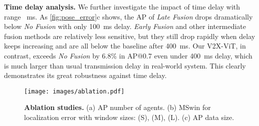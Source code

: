 \documentclass[runningheads]{llncs}
\begin{document}
\noindent\textbf{Time delay analysis.}
We further investigate the impact of time delay with range ~ms. As \cref{fig:pose_error}c shows, the AP of \textit{Late Fusion} drops dramatically below \textit{No Fusion} with only 100~ms delay. \textit{Early Fusion} and other intermediate fusion methods are relatively less sensitive, but they still drop rapidly when delay keeps increasing and are all below the baseline after 400~ms. Our V2X-ViT, in contrast,  exceeds \textit{No Fusion} by 6.8\% in AP@0.7 even under 400~ms delay, which is much larger than usual transmission delay in real-world system\cite{tsukada2020autoc2x}. This clearly demonstrates its great robustness against time delay.

\begin{figure*}[!t]
\centering
\texttt{[image: images/ablation.pdf]}
\vspace{-2mm}
\caption{\textbf{Ablation studies.} (a) AP \vs number of agents. (b) MSwin for localization error with window sizes:  (S),  (M),  (L). (c) AP \vs data size.}
\label{fig:ablation}
\vspace{-2mm}
\end{figure*}
\end{document}
